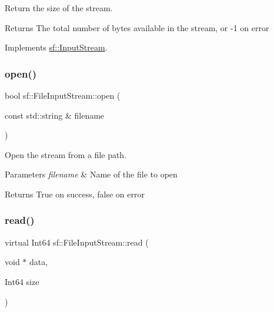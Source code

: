 Return the size of the stream. 

\begin{DoxyReturn}{Returns}
The total number of bytes available in the stream, or -\/1 on error 
\end{DoxyReturn}


Implements \hyperlink{classsf_1_1_input_stream_a311eaaaa65d636728e5153b574b72d5d}{sf\+::\+Input\+Stream}.

\mbox{\label{classsf_1_1_file_input_stream_a87a95dc3a71746097a99c86ee58bb353}} 
\subsubsection{\texorpdfstring{open()}{open()}}
{\footnotesize\ttfamily bool sf\+::\+File\+Input\+Stream\+::open (\begin{DoxyParamCaption}\item[{const std\+::string \&}]{filename }\end{DoxyParamCaption})}



Open the stream from a file path. 


\begin{DoxyParams}{Parameters}
{\em filename} & Name of the file to open\\
\hline
\end{DoxyParams}
\begin{DoxyReturn}{Returns}
True on success, false on error 
\end{DoxyReturn}
\mbox{\label{classsf_1_1_file_input_stream_ad1e94c4152429f485db224c44ee1eb50}} 
\subsubsection{\texorpdfstring{read()}{read()}}
{\footnotesize\ttfamily virtual Int64 sf\+::\+File\+Input\+Stream\+::read (\begin{DoxyParamCaption}\item[{void $\ast$}]{data,  }\item[{Int64}]{size }\end{DoxyParamCaption})\hspace{0.3cm}{\ttfamily [virtual]}}



